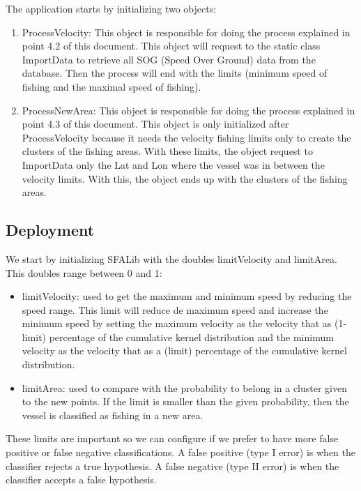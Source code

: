 The application starts by initializing two objects:
\begin{enumerate}
\item ProcessVelocity: This object is responsible for doing the process explained in point 4.2 of this document. This object will request to the static class ImportData to retrieve all SOG (Speed Over Ground) data from the database. Then the process will end with the limits (minimum speed of fishing and the maximal speed of fishing).
\item ProcessNewArea: This object is responsible for doing the process explained in point 4.3 of this document. This object is only initialized after ProcessVelocity because it needs the velocity fishing limits only to create the clusters of the fishing areas. With these limits, the object request to ImportData only the Lat and Lon where the vessel was in between the velocity limits. With this, the object ends up with the clusters of the fishing areas.
\end{enumerate}



\subsection{Deployment} %
\label{sub:deployment}

We start by initializing SFALib with the doubles limitVelocity and limitArea. This doubles range between 0 and 1:
\begin{itemize}
\item limitVelocity: used to get the maximum and minimum speed by reducing the speed range. This limit will reduce de maximum speed and increase the minimum speed by setting the maximum velocity as the velocity that as (1-limit) percentage of the cumulative kernel distribution and the minimum velocity as the velocity that as a (limit) percentage of the cumulative kernel distribution.
\item limitArea: used to compare with the probability to belong in a cluster given to the new points. If the limit is smaller than the given probability, then the vessel is classified as fishing in a new area.
\end{itemize}
These limits are important so we can configure if we prefer to have more false positive or false negative classifications.
A false positive (type I error) is when the classifier rejects a true hypothesis.
A false negative (type II error) is when the classifier accepts a false hypothesis.

